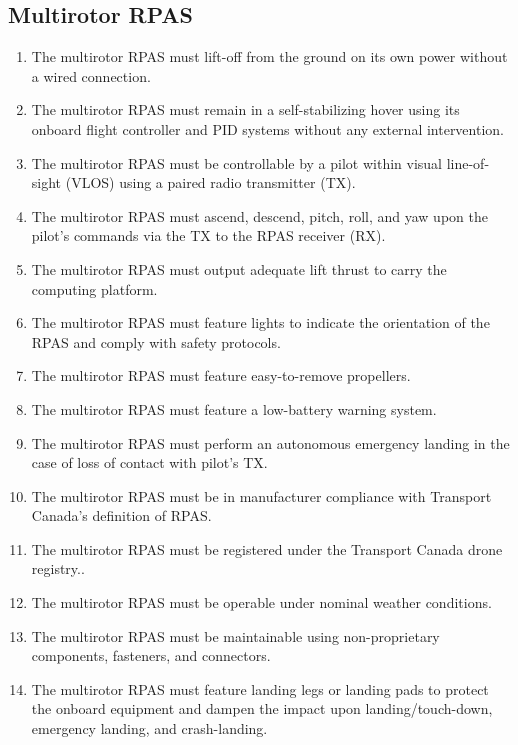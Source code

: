 \documentclass[10pt,letterpaper]{article}
\begin{document}
\subsection{Multirotor RPAS}
\begin{enumerate}[label=F.DR.\arabic*, wide=1cm, widest=3cm, leftmargin=*, font=\bfseries, noitemsep,topsep=0pt, parsep=4pt, partopsep=0pt]
	\item The multirotor RPAS must lift-off from the ground on its own power without a wired connection.
	\item The multirotor RPAS must remain in a self-stabilizing hover using its onboard flight controller and PID systems without any external intervention.
	\item The multirotor RPAS must be controllable by a pilot within visual line-of-sight (VLOS) using a paired radio transmitter (TX).
	\item The multirotor RPAS must ascend, descend, pitch, roll, and yaw upon the pilot's commands via the TX to the RPAS receiver (RX).
	\item The multirotor RPAS must output adequate lift thrust to carry the computing platform.
	\item The multirotor RPAS must feature lights to indicate the orientation of the RPAS and comply with safety protocols.
	\item The multirotor RPAS must feature easy-to-remove propellers.
	\item The multirotor RPAS must feature a low-battery warning system.
	\item The multirotor RPAS must perform an autonomous emergency landing in the case of loss of contact with pilot's TX.
	\item The multirotor RPAS must be in manufacturer compliance with Transport Canada's definition of RPAS\cite{tp15263}.
	\item The multirotor RPAS must be registered under the Transport Canada drone registry.\cite{tcdronereg}.
	\item The multirotor RPAS must be operable under nominal weather conditions.
	\item The multirotor RPAS must be maintainable using non-proprietary components, fasteners, and connectors.
	\item The multirotor RPAS must feature landing legs or landing pads to protect the onboard equipment and dampen the impact upon landing/touch-down, emergency landing, and crash-landing.
\end{enumerate}
\end{document}
